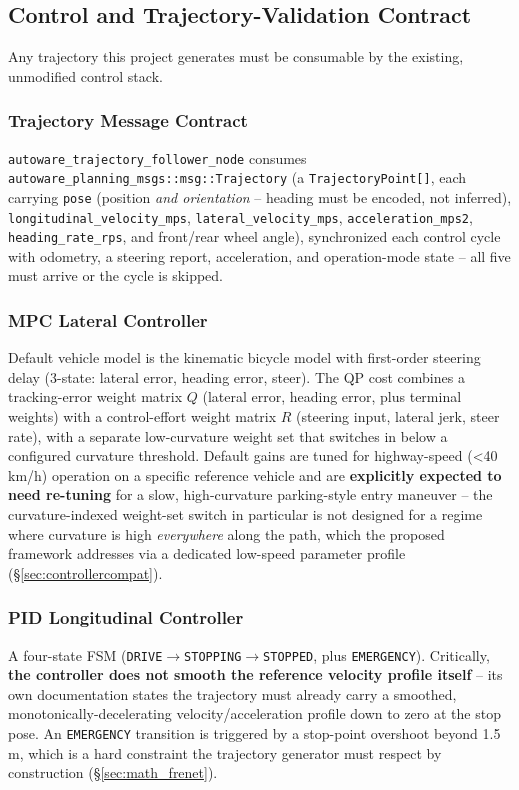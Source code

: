 \documentclass[11pt]{article}
\newcommand{\code}[1]{\texttt{#1}}
\newcommand{\pkg}[1]{\texttt{#1}}
\begin{document}
\subsection{Control and Trajectory-Validation Contract}
\label{sec:control}

Any trajectory this project generates must be consumable by the existing, unmodified control stack.

\subsubsection{Trajectory Message Contract}
\pkg{autoware\_trajectory\_follower\_node} consumes
\code{autoware\_planning\_msgs::msg::Trajectory} (a \code{TrajectoryPoint[]}, each carrying
\code{pose} (position \emph{and orientation} -- heading must be encoded, not inferred),
\code{longitudinal\_velocity\_mps}, \code{lateral\_velocity\_mps}, \code{acceleration\_mps2},
\code{heading\_rate\_rps}, and front/rear wheel angle), synchronized each control cycle with
odometry, a steering report, acceleration, and operation-mode state -- all five must arrive or the
cycle is skipped.

\subsubsection{MPC Lateral Controller}
Default vehicle model is the kinematic bicycle model with first-order steering delay (3-state:
lateral error, heading error, steer). The QP cost combines a tracking-error weight matrix $Q$
(lateral error, heading error, plus terminal weights) with a control-effort weight matrix $R$
(steering input, lateral jerk, steer rate), with a separate low-curvature weight set that switches
in below a configured curvature threshold. Default gains are tuned for highway-speed
(\textless40\,km/h) operation on a specific reference vehicle and are \textbf{explicitly expected to
need re-tuning} for a slow, high-curvature parking-style entry maneuver -- the curvature-indexed
weight-set switch in particular is not designed for a regime where curvature is high
\emph{everywhere} along the path, which the proposed framework addresses via a dedicated low-speed
parameter profile (\S\ref{sec:controllercompat}).

\subsubsection{PID Longitudinal Controller}
A four-state FSM (\code{DRIVE}$\to$\code{STOPPING}$\to$\code{STOPPED}, plus \code{EMERGENCY}).
Critically, \textbf{the controller does not smooth the reference velocity profile itself} -- its
own documentation states the trajectory must already carry a smoothed, monotonically-decelerating
velocity/acceleration profile down to zero at the stop pose. An \code{EMERGENCY} transition is
triggered by a stop-point overshoot beyond 1.5\,m, which is a hard constraint the trajectory
generator must respect by construction (\S\ref{sec:math_frenet}).
\end{document}
